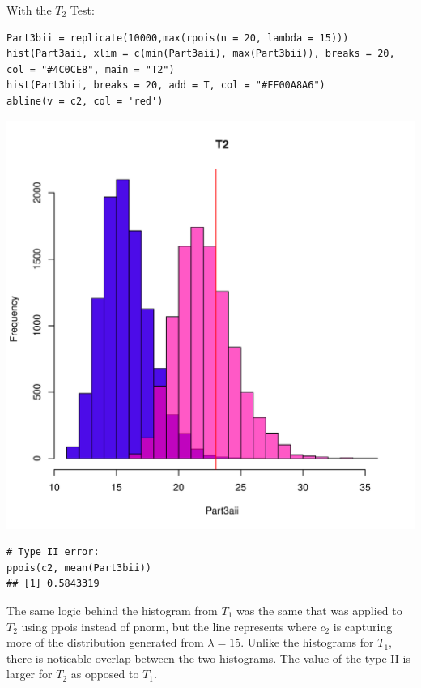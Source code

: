 \documentclass{article}\usepackage[]{graphicx}\usepackage[]{color}
\makeatletter
\newenvironment{kframe}{%
 \def\at@end@of@kframe{}%
 \ifinner\ifhmode%
  \def\at@end@of@kframe{\end{minipage}}%
  \begin{minipage}{\columnwidth}%
 \fi\fi%
 \def\FrameCommand##1{\hskip\@totalleftmargin \hskip-\fboxsep
 \colorbox{shadecolor}{##1}\hskip-\fboxsep
     \hskip-\linewidth \hskip-\@totalleftmargin \hskip\columnwidth}%
 \MakeFramed {\advance\hsize-\width
   \@totalleftmargin\z@ \linewidth\hsize
   \@setminipage}}%
 {\par\unskip\endMakeFramed%
 \at@end@of@kframe}
\newenvironment{knitrout}{}{} %
\makeatother
\begin{document}
With the $T_{2}$ Test:
\begin{knitrout}
\color{fgcolor}\begin{kframe}
\begin{verbatim}
Part3bii = replicate(10000,max(rpois(n = 20, lambda = 15)))
hist(Part3aii, xlim = c(min(Part3aii), max(Part3bii)), breaks = 20, col = "#4C0CE8", main = "T2")
hist(Part3bii, breaks = 20, add = T, col = "#FF00A8A6")
abline(v = c2, col = 'red')
\end{verbatim}
\end{kframe}
\includegraphics[width=0.33\linewidth]{figure/unnamed-chunk-9-1} 
\begin{kframe}\begin{verbatim}
# Type II error:
ppois(c2, mean(Part3bii))
## [1] 0.5843319
\end{verbatim}
\end{kframe}
\end{knitrout}
The same logic behind the histogram from $T_{1}$ was the same that was applied to $T_{2}$ using ppois instead of pnorm, but the line represents where $c_{2}$ is capturing more of the distribution generated from $\lambda=15$. Unlike the histograms for $T_{1}$, there is noticable overlap between the two histograms. The value of the type II is larger for $T_{2}$ as opposed to $T_{1}$. 
\end{document}
